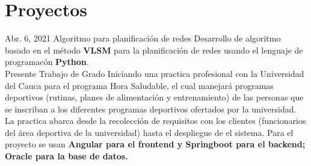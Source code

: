\documentclass[american]{cv-class}
\begin{document}
	\section{Proyectos}
    \begin{entrylist}
    \entry
    	{Abr. 6, 2021}
    	{Algoritmo para planificación de redes}
    	{ }
    	{\justifying Desarrollo de algoritmo basado en el método \textbf{VLSM} 
    	para la planificación de redes usando el lenguaje de programacón \textbf{Python}.}
    \\
    \entry
    	{Presente}
    	{Trabajo de Grado}
    	{ }
    	{\justifying Iniciando una practica profesional con la Universidad del Cauca para el programa Hora Saludable, el cual manejará programas deportivos (rutinas, planes de alimentación y entrenamiento) de las personas que se inscriban a los diferentes programas deportivos ofertados por la universidad. La practica abarca desde la recolección de requisitos con los clientes (funcionarios del área deportiva de la universidad) hasta el despliegue de el sistema. Para el proyecto se usan \textbf{Angular para el frontend y Springboot para el backend; Oracle para la base de datos.}}
    	
    \end{entrylist}
\end{document}
